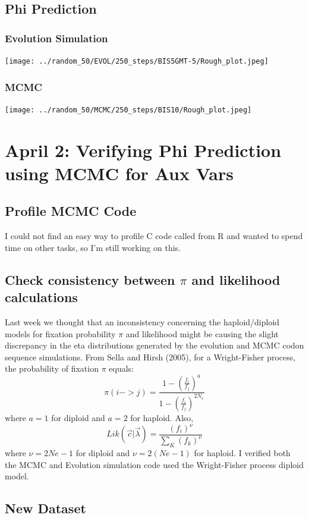 \documentclass{article}
\begin{document}
\subsection{Phi Prediction}
\subsubsection{Evolution Simulation}
\texttt{[image: ../random\_50/EVOL/250\_steps/BIS5GMT-5/Rough\_plot.jpeg]}
\subsubsection{MCMC}
\texttt{[image: ../random\_50/MCMC/250\_steps/BIS10/Rough\_plot.jpeg]}
\newpage
\section{April 2: Verifying Phi Prediction using MCMC for Aux Vars}
\subsection{Profile MCMC Code}

I could not find an easy way to profile C code called from R and wanted to spend time on other tasks, so I'm still working on this.

\subsection{Check consistency between $\pi$ and likelihood calculations}
Last week we thought that an inconsistency concerning the haploid/diploid models for fixation probability $\pi$ and likelihood might be causing the slight discrepancy in the eta distributions generated by the evolution and MCMC codon sequence simulations.
From Sella and Hirsh (2005), for a Wright-Fisher process, the probability of fixation $\pi$ equals:
\begin{equation}
\pi(i->j) = \displaystyle{\frac{1-\left(\frac{f_i}{f_j}\right)^a}{1-\left(\frac{f_i}{f_j}\right)^{2N_e}}}
\end{equation}
where $a=1$ for diploid and $a=2$ for haploid. Also, 
\begin{equation}
Lik(\vec{c}|\vec{\lambda}) = \frac{(f_i)^\nu}{\sum_K(f_k)^\nu}
\end{equation}
where $\nu = 2Ne-1$ for diploid and $\nu = 2(Ne-1)$ for haploid. I verified both the MCMC and Evolution simulation code used the Wright-Fisher process diploid model.

\subsection{New Dataset}
\end{document}
